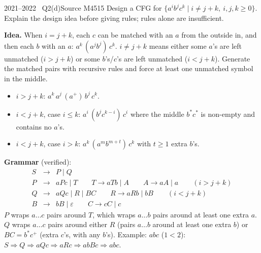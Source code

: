 \documentclass[11pt,a4paper]{article}
\newcommand{\eps}{\varepsilon}
\begin{document}
\begin{question}{2021--2022 \textbullet\ Q2(d)}{Source M45}{15}
Design a CFG for $\{a^ib^jc^k\mid i\neq j+k,\ i,j,k\ge0\}$. Explain the design idea before giving rules; rules alone are insufficient.
\end{question}
\begin{solution}
\textbf{Idea.} When $i=j+k$, each $c$ can be matched with an $a$ from the outside in, and then each $b$ with an $a$: $a^k\,(a^jb^j)\,c^k$. $i\neq j+k$ means either some $a$'s are left unmatched ($i>j+k$) or some $b$'s/$c$'s are left unmatched ($i<j+k$). Generate the matched pairs with recursive rules and force at least one unmatched symbol in the middle.
\begin{itemize}
\item $i>j+k$: $a^k\,a^j\,(a^+)\,b^j\,c^k$.
\item $i<j+k$, case $i\le k$: $a^i\,(b^jc^{k-i})\,c^i$ where the middle $b^*c^*$ is non-empty and contains no $a$'s.
\item $i<j+k$, case $i>k$: $a^k\,(a^{m}b^{m+t})\,c^k$ with $t\ge1$ extra $b$'s.
\end{itemize}
\textbf{Grammar} (verified):
\[\begin{array}{rcl}
S&\to& P\mid Q\\
P&\to& aPc\mid T \qquad T\to aTb\mid A \qquad A\to aA\mid a \qquad (i>j+k)\\
Q&\to& aQc\mid R\mid BC \qquad R\to aRb\mid bB \qquad (i<j+k)\\
B&\to& bB\mid\eps \qquad C\to cC\mid c
\end{array}\]
$P$ wraps $a\ldots c$ pairs around $T$, which wraps $a\ldots b$ pairs around at least one extra $a$. $Q$ wraps $a\ldots c$ pairs around either $R$ (pairs $a\ldots b$ around at least one extra $b$) or $BC=b^*c^+$ (extra $c$'s, with any $b$'s). Example: $abc$ ($1<2$): $S\Rightarrow Q\Rightarrow aQc\Rightarrow aRc\Rightarrow abBc\Rightarrow abc$.
\end{solution}
\end{document}
